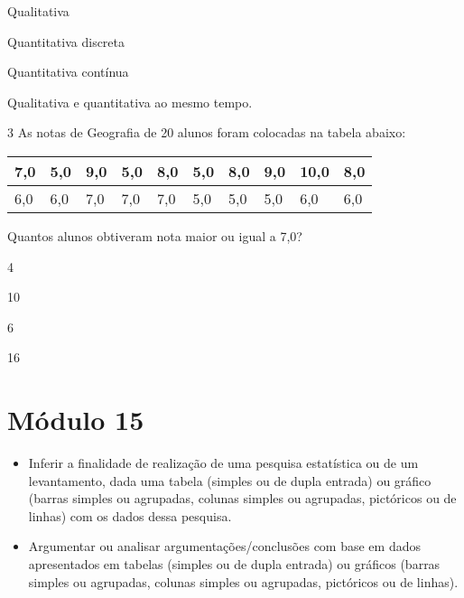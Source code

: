 \begin{escolha}
\item
  Qualitativa
\item
  Quantitativa discreta
\item
  Quantitativa contínua
\item
  Qualitativa e quantitativa ao mesmo tempo.
\end{escolha}


\num{3} As notas de Geografia de 20 alunos foram colocadas na tabela
abaixo:

\begin{longtable}[]{@{}llllllllll@{}}
\toprule
7,0 & 5,0 & 9,0 & 5,0 & 8,0 & 5,0 & 8,0 & 9,0 & 10,0 &
8,0\tabularnewline
\midrule
\endhead
6,0 & 6,0 & 7,0 & 7,0 & 7,0 & 5,0 & 5,0 & 5,0 & 6,0 & 6,0\tabularnewline
\bottomrule
\end{longtable}

Quantos alunos obtiveram nota maior ou igual a 7,0?

\begin{escolha}
\item
  4
\item
  10
\item
  6
\item
  16
\end{escolha}


\chapter{Módulo 15}


\begin{itemize}
\item Inferir a finalidade de realização de uma pesquisa estatística ou de
um levantamento, dada uma tabela (simples ou de dupla entrada) ou
gráfico (barras simples ou agrupadas, colunas simples ou agrupadas,
pictóricos ou de linhas) com os dados dessa pesquisa.

\item Argumentar ou analisar argumentações/conclusões com base em dados
apresentados em tabelas (simples ou de dupla entrada) ou gráficos
(barras simples ou agrupadas, colunas simples ou agrupadas, pictóricos
ou de linhas).
\end{itemize}

